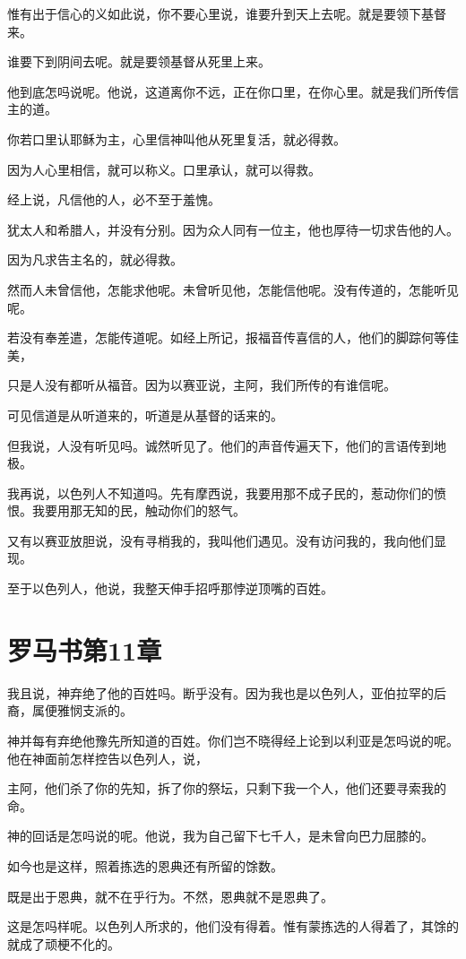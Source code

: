 \documentclass[12pt,oneside]{book}
\begin{document}
惟有出于信心的义如此说，你不要心里说，谁要升到天上去呢。就是要领下基督来。

谁要下到阴间去呢。就是要领基督从死里上来。

他到底怎吗说呢。他说，这道离你不远，正在你口里，在你心里。就是我们所传信主的道。

你若口里认耶稣为主，心里信神叫他从死里复活，就必得救。

因为人心里相信，就可以称义。口里承认，就可以得救。

经上说，凡信他的人，必不至于羞愧。

犹太人和希腊人，并没有分别。因为众人同有一位主，他也厚待一切求告他的人。

因为凡求告主名的，就必得救。

然而人未曾信他，怎能求他呢。未曾听见他，怎能信他呢。没有传道的，怎能听见呢。

若没有奉差遣，怎能传道呢。如经上所记，报福音传喜信的人，他们的脚踪何等佳美，

只是人没有都听从福音。因为以赛亚说，主阿，我们所传的有谁信呢。

可见信道是从听道来的，听道是从基督的话来的。

但我说，人没有听见吗。诚然听见了。他们的声音传遍天下，他们的言语传到地极。

我再说，以色列人不知道吗。先有摩西说，我要用那不成子民的，惹动你们的愤恨。我要用那无知的民，触动你们的怒气。

又有以赛亚放胆说，没有寻梢我的，我叫他们遇见。没有访问我的，我向他们显现。

至于以色列人，他说，我整天伸手招呼那悖逆顶嘴的百姓。

\chapter{罗马书第11章}
我且说，神弃绝了他的百姓吗。断乎没有。因为我也是以色列人，亚伯拉罕的后裔，属便雅悯支派的。

神并每有弃绝他豫先所知道的百姓。你们岂不晓得经上论到以利亚是怎吗说的呢。他在神面前怎样控告以色列人，说，

主阿，他们杀了你的先知，拆了你的祭坛，只剩下我一个人，他们还要寻索我的命。

神的回话是怎吗说的呢。他说，我为自己留下七千人，是未曾向巴力屈膝的。

如今也是这样，照着拣选的恩典还有所留的馀数。

既是出于恩典，就不在乎行为。不然，恩典就不是恩典了。

这是怎吗样呢。以色列人所求的，他们没有得着。惟有蒙拣选的人得着了，其馀的就成了顽梗不化的。
\end{document}
